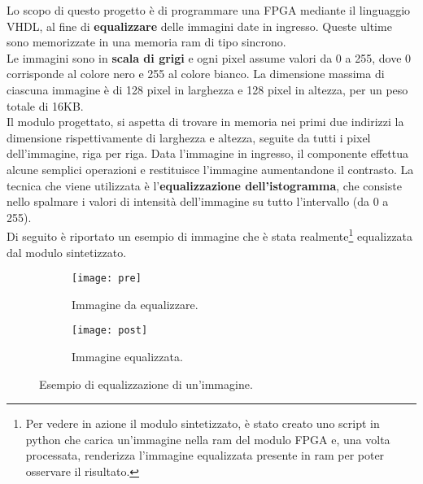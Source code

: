 Lo scopo di questo progetto è di programmare una FPGA mediante il linguaggio VHDL, al fine di \textbf{equalizzare} delle immagini date in ingresso. Queste ultime sono memorizzate in una memoria ram di tipo sincrono.\\
Le immagini sono in \textbf{scala di grigi} e ogni pixel assume valori da 0 a 255, dove 0 corrisponde al colore nero e 255 al colore bianco. La dimensione massima di ciascuna immagine è di 128 pixel in larghezza e 128 pixel in altezza, per un peso totale di 16KB.\\
Il modulo progettato, si aspetta di trovare in memoria nei primi due indirizzi la dimensione rispettivamente di larghezza e altezza, seguite da tutti i pixel dell'immagine, riga per riga. Data l'immagine in ingresso, il componente effettua alcune semplici operazioni e restituisce l'immagine aumentandone il contrasto. La tecnica che viene utilizzata è l'\textbf{equalizzazione dell'istogramma}, che consiste nello spalmare i valori di intensità dell'immagine su tutto l'intervallo  (da 0 a 255).\\
Di seguito è riportato un esempio di immagine che è stata realmente\footnote{Per vedere in azione il modulo sintetizzato, è stato creato uno script in python che carica un'immagine nella ram del modulo FPGA e, una volta processata, renderizza l'immagine equalizzata presente in ram per poter osservare il risultato.} equalizzata dal modulo sintetizzato.

\begin{figure}[h!]
  \centering
  \begin{subfigure}[b]{0.4\linewidth}
    \texttt{[image: pre]}
    \caption{Immagine da equalizzare.}
  \end{subfigure}
  \begin{subfigure}[b]{0.4\linewidth}
    \texttt{[image: post]}
    \caption{Immagine equalizzata.}
  \end{subfigure}
  \caption{Esempio di equalizzazione di un'immagine.}
  \label{fig:equalized}
\end{figure}
